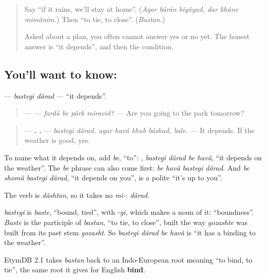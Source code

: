 \label{lesson:FA-C298-bastegi-darad}



\begin{quote}
Say \textquotedblleft{}if it rains, we'll stay at home\textquotedblright{}. (\emph{Agar bârân biyâyad, dar khâne mimânim.}) Then \textquotedblleft{}to tie, to close\textquotedblright{}. (\emph{Bastan.})

Asked about a plan, you often cannot answer yes or no yet. The honest answer is \textquotedblleft{}it depends\textquotedblright{}, and then the condition.
\end{quote}

\subsection*{You'll want to know:  }
\textbf{ } — \emph{bastegi dârad} — \textquotedblleft{}it depends\textquotedblright{}.

\begin{quote}
— \textbf{   } — \emph{fardâ be pârk miravid?} — Are you going to the park tomorrow?
\end{quote}

\begin{quote}
— \textbf{ .     .} — \emph{bastegi dârad. agar havâ khub bâshad, bale.} — It depends. If the weather is good, yes.
\end{quote}

To name what it depends on, add \emph{be}, \textquotedblleft{}to\textquotedblright{}: \textbf{   }, \emph{bastegi dârad be havâ}, \textquotedblleft{}it depends on the weather\textquotedblright{}. The \emph{be} phrase can also come first: \emph{be havâ bastegi dârad}. And \emph{be shomâ bastegi dârad}, \textquotedblleft{}it depends on you\textquotedblright{}, is a polite \textquotedblleft{}it's up to you\textquotedblright{}.

The verb is \emph{dâshtan}, so it takes no \emph{mi-}: \emph{dârad}.

\begin{cousinweb}
\emph{bastegi} is \emph{baste}, \textquotedblleft{}bound, tied\textquotedblright{}, with \emph{-gi}, which makes a noun of it: \textquotedblleft{}boundness\textquotedblright{}. \emph{Baste} is the participle of \emph{bastan}, \textquotedblleft{}to tie, to close\textquotedblright{}, built the way \emph{gozashte} was built from its past stem \emph{gozasht}. So \emph{bastegi dârad be havâ} is \textquotedblleft{}it has a binding to the weather\textquotedblright{}.

EtymDB 2.1 takes \emph{bastan} back to an Indo-European root meaning \textquotedblleft{}to bind, to tie\textquotedblright{}, the same root it gives for English \textbf{bind}.
\end{cousinweb}


